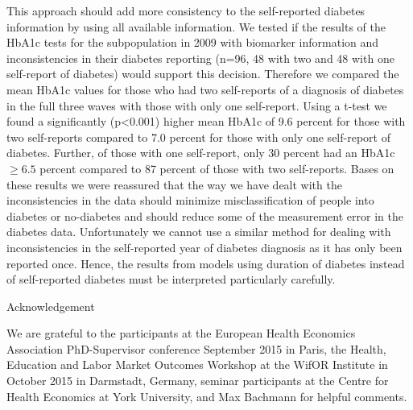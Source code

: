 \documentclass[12pt,english,british]{article}
\begin{document}
\begin{appendix}
This approach should add more consistency to the self-reported diabetes
information by using all available information. We tested if the results
of the \ac{HbA1c} tests for the subpopulation in 2009 with biomarker
information and inconsistencies in their diabetes reporting (n=96,
48 with two and 48 with one self-report of diabetes) would support
this decision. Therefore we compared the mean \ac{HbA1c} values for those
who had two self-reports of a diagnosis of diabetes in the full three
waves with those with only one self-report. Using a t-test we found
a significantly (p<0.001) higher mean \ac{HbA1c} of 9.6 percent
for those with two self-reports compared to 7.0 percent for those
with only one self-report of diabetes. Further, of those with one
self-report, only 30 percent had an \ac{HbA1c}$\geq6.5$ percent
compared to 87 percent of those with two self-reports. Bases on these results we were reassured that the way we have dealt with the inconsistencies in the data should
minimize misclassification of people into diabetes or no-diabetes
and should reduce some of the measurement error in the diabetes data. Unfortunately we cannot use a similar method for dealing with inconsistencies
in the self-reported year of diabetes diagnosis as it has only been reported once. Hence, the results from models using
duration of diabetes instead of self-reported diabetes must be interpreted
particularly carefully.

\end{appendix}

Acknowledgement

We are grateful to the participants at the European Health Economics Association PhD-Supervisor conference September 2015 in Paris, the Health, Education and Labor Market Outcomes Workshop at the WifOR Institute in October 2015 in Darmstadt, Germany, seminar participants at the Centre for Health Economics at York University, and Max Bachmann for helpful comments.


\noindent  

%


\end{document}
